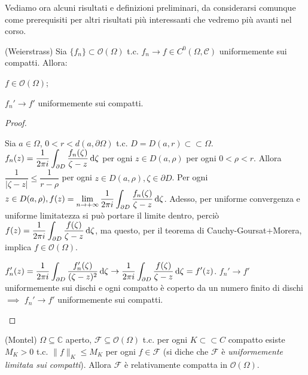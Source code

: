 Vediamo ora alcuni risultati e definizioni preliminari, da considerarsi comunque come prerequisiti per altri risultati più interessanti che vedremo più avanti nel corso.

\begin{thm}
  (Weierstrass) Sia $\{f_n\} \subset \mathcal{O}(\Omega)$ t.c. $f_n \rightarrow f \in C^0(\Omega, \mathcal{C})$ uniformemente sui compatti. Allora:
  \begin{nlist}
    \item $f \in \mathcal{O}(\Omega)$;
    \item $f_n' \rightarrow f'$ uniformemente sui compatti.
  \end{nlist}
\end{thm}

\begin{proof}
  \begin{nlist}
    \item Sia $a \in \Omega$, $0<r<d(a, \partial\Omega)$ t.c. $D=D(a, r) \subset \subset \Omega$. $\displaystyle f_n(z)=\frac{1}{2\pi i} \int_{\partial D} \frac{f_n(\zeta)}{\zeta-z} \mathop{}\!\mathrm{d} \zeta$ per ogni $z \in D(a, \rho)$ per ogni $0<\rho<r$.
    Allora $\dfrac{1}{|\zeta-z|} \le \dfrac{1}{r-\rho}$ per ogni $z \in D(a, \rho), \zeta \in \partial{D}$.
    Per ogni $\displaystyle z \in D(a, \rho), f(z)=\lim_{n \rightarrow +\infty} \frac{1}{2\pi i} \int_{\partial D} \frac{f_n(\zeta)}{\zeta-z} \mathop{}\!\mathrm{d} \zeta$.
    Adesso, per uniforme convergenza e uniforme limitatezza si può portare il limite dentro, perciò $\displaystyle f(z)=\frac{1}{2\pi i}\int_{\partial D} \frac{f(\zeta)}{\zeta-z} \mathop{}\!\mathrm{d} \zeta$, ma questo, per il teorema di Cauchy-Goursat+Morera, implica $f \in \mathcal{O}(\Omega)$.
    \item $\displaystyle f_n'(z)=\frac{1}{2\pi i} \int_{\partial D} \frac{f_n'(\zeta)}{(\zeta-z)^2}\mathop{}\!\mathrm{d}\zeta \rightarrow \frac{1}{2\pi i} \int_{\partial D} \frac{f(\zeta)}{\zeta-z} \mathop{}\!\mathrm{d}\zeta=f'(z)$.
    $f_n' \rightarrow f'$ uniformemente sui dischi e ogni compatto è coperto da un numero finito di dischi $\implies$ $f_n' \rightarrow f'$ uniformemente sui compatti.
  \end{nlist}
\end{proof}

\begin{thm}
  (Montel) $\Omega \subseteq \mathbb{C}$ aperto, $\mathcal{F} \subseteq \mathcal{O}(\Omega)$ t.c. per ogni $K \subset \subset C$ compatto esiste $M_K>0$ t.c. $\|f\|_K \le M_K$ per ogni $f \in \mathcal{F}$ (si diche che $\mathcal{F}$ è \textit{uniformemente limitata sui compatti}).
  Allora $\mathcal{F}$ è relativamente compatta in $\mathcal{O}(\Omega)$.
\end{thm}

